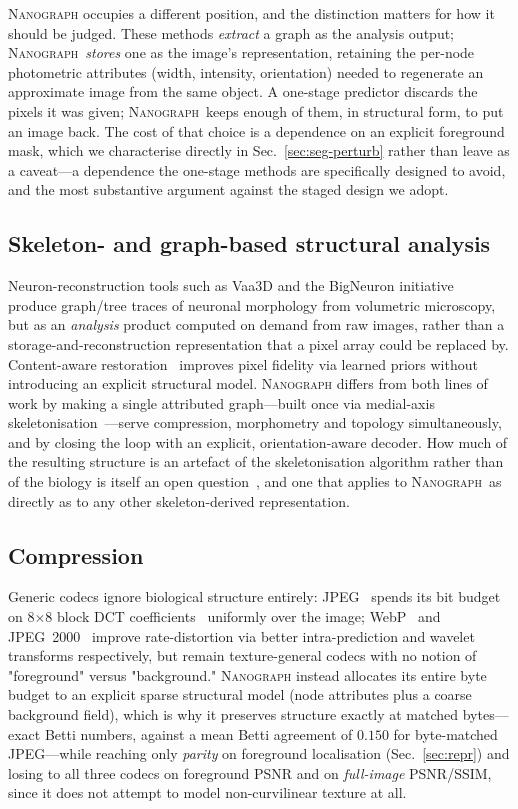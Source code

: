 \documentclass[10pt,a4paper]{article}
\newcommand{\method}{\textnormal{\textsc{Nanograph}}\xspace}
\begin{document}
\method occupies a different position, and the distinction matters for how
it should be judged. These methods \emph{extract} a graph as the analysis
output; \method\ \emph{stores} one as the image's representation, retaining
the per-node photometric attributes (width, intensity, orientation) needed
to regenerate an approximate image from the same object. A one-stage
predictor discards the pixels it was given; \method\ keeps enough of them,
in structural form, to put an image back. The cost of that choice is a
dependence on an explicit foreground mask, which we characterise directly in
Sec.~\ref{sec:seg-perturb} rather than leave as a caveat---a dependence
the one-stage methods are specifically designed to avoid, and the most
substantive argument against the staged design we adopt.

\subsection{Skeleton- and graph-based structural analysis}
Neuron-reconstruction tools such as Vaa3D and the BigNeuron
initiative~\cite{vaa3d,bigneuron} produce graph/tree traces of neuronal
morphology from volumetric microscopy, but as an \emph{analysis} product
computed on demand from raw images, rather than a storage-and-reconstruction
representation that a pixel array could be replaced by. Content-aware
restoration~\cite{care} improves pixel fidelity via learned priors without
introducing an explicit structural model. \method differs from both lines of
work by making a single attributed graph---built once via medial-axis
skeletonisation~\cite{lee}---serve compression, morphometry and topology
simultaneously, and by closing the loop with an explicit, orientation-aware
decoder. How much of the resulting structure is an artefact of the
skeletonisation algorithm rather than of the biology is itself an open
question~\cite{walsh2024groundtruth}, and one that applies to \method\ as
directly as to any other skeleton-derived representation.

\subsection{Compression}
Generic codecs ignore biological structure entirely: JPEG~\cite{jpeg} spends
its bit budget on 8$\times$8 block DCT coefficients~\cite{ahmed1974dct}
uniformly over the image; WebP~\cite{webp} and JPEG~2000~\cite{skodras2001jpeg2000}
improve rate-distortion via better intra-prediction and wavelet transforms
respectively, but remain texture-general codecs with no notion of
"foreground" versus "background." \method instead allocates its entire byte
budget to an explicit sparse structural model (node attributes plus a coarse
background field), which is why it preserves structure
exactly at matched bytes---exact Betti numbers, against a mean Betti
agreement of $0.150$ for byte-matched JPEG---while reaching only
\emph{parity} on foreground localisation (Sec.~\ref{sec:repr}) and losing to
all three codecs on foreground PSNR and on \emph{full-image} PSNR/SSIM, since
it does not attempt to model non-curvilinear texture at all.
\end{document}
